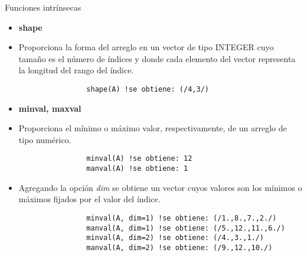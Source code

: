 \begin{frame}[fragile]{Funciones intrínsecas} 
    \begin{itemize}[<+(0)->]
        \item [] \textbf{shape} 
        \item Proporciona la forma del arreglo en un vector de tipo INTEGER cuyo tamaño es el número de índices y donde cada elemento del vector representa la longitud del rango del índice.
             \vspace{0.1cm}
            \begin{verbatim}
                shape(A) !se obtiene: (/4,3/)
            \end{verbatim}
        \item [] \textbf{minval, maxval} 
        \item Proporciona el mínimo o máximo valor, respectivamente, de un arreglo de tipo numérico.
            \vspace{0.1cm}
            \begin{verbatim}
                minval(A) !se obtiene: 12
                manval(A) !se obtiene: 1
            \end{verbatim}
        \item [] Agregando la opción \emph{dim} se obtiene un vector cuyos valores son los mínimos o máximos fijados por el valor del índice.
            \vspace{0.1cm}
            \begin{verbatim}
                minval(A, dim=1) !se obtiene: (/1.,8.,7.,2./)
                manval(A, dim=1) !se obtiene: (/5.,12.,11.,6./)
                minval(A, dim=2) !se obtiene: (/4.,3.,1./)
                manval(A, dim=2) !se obtiene: (/9.,12.,10./)
            \end{verbatim}
    \end{itemize}
\end{frame}


